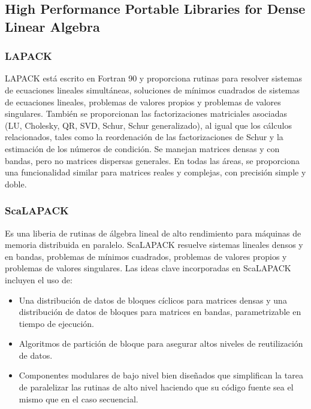 \subsection{High Performance Portable Libraries for Dense Linear Algebra}
    \def\text{overall picture}
    \def\path{overall.png}
    \def\scale{.6}
    
    \subsubsection{LAPACK}
        LAPACK está escrito en Fortran 90 y proporciona rutinas para resolver
        sistemas de ecuaciones lineales simultáneas, soluciones de mínimos
        cuadrados de sistemas de ecuaciones lineales, problemas de valores propios y
        problemas de valores singulares. También se proporcionan las factorizaciones
        matriciales asociadas (LU, Cholesky, QR, SVD, Schur, Schur generalizado),
        al igual que los cálculos relacionados, tales como la reordenación de las
        factorizaciones de Schur y la estimación de los números de condición. Se
        manejan matrices densas y con bandas, pero no matrices dispersas generales.
        En todas las áreas, se proporciona una funcionalidad similar para matrices
        reales y complejas, con precisión simple y doble.

    \subsubsection{ScaLAPACK}
        Es una liberia de rutinas de álgebra lineal de alto rendimiento para máquinas
        de memoria distribuida en paralelo. ScaLAPACK resuelve sistemas lineales
        densos y en bandas, problemas de mínimos cuadrados, problemas de valores
        propios y problemas de valores singulares. Las ideas clave incorporadas en
        ScaLAPACK incluyen el uso de:
        \begin{itemize}
            \item Una distribución de datos de bloques cíclicos para matrices densas
            y una distribución de datos de bloques para matrices en bandas,
            parametrizable en tiempo de ejecución.
            \item Algoritmos de partición de bloque para asegurar altos niveles de
            reutilización de datos.
            \item Componentes modulares de bajo nivel bien diseñados que simplifican
            la tarea de paralelizar las rutinas de alto nivel haciendo que su código
            fuente sea el mismo que en el caso secuencial.
        \end{itemize}

